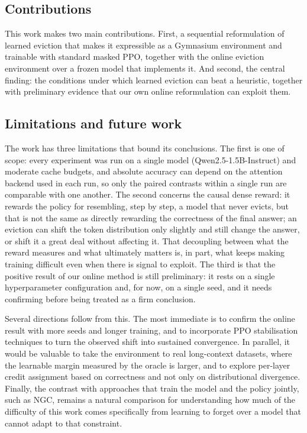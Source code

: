 \subsection{Contributions}

This work makes two main contributions. First, a sequential reformulation of learned eviction that makes it expressible as a Gymnasium environment and trainable with standard masked PPO, together with the online eviction environment over a frozen model that implements it. And second, the central finding: the conditions under which learned eviction can beat a heuristic, together with preliminary evidence that our own online reformulation can exploit them.

\subsection{Limitations and future work}

The work has three limitations that bound its conclusions. The first is one of scope: every experiment was run on a single model (Qwen2.5-1.5B-Instruct) and moderate cache budgets, and absolute accuracy can depend on the attention backend used in each run, so only the paired contrasts within a single run are comparable with one another. The second concerns the causal dense reward: it rewards the policy for resembling, step by step, a model that never evicts, but that is not the same as directly rewarding the correctness of the final answer; an eviction can shift the token distribution only slightly and still change the answer, or shift it a great deal without affecting it. That decoupling between what the reward measures and what ultimately matters is, in part, what keeps making training difficult even when there is signal to exploit. The third is that the positive result of our online method is still preliminary: it rests on a single hyperparameter configuration and, for now, on a single seed, and it needs confirming before being treated as a firm conclusion.

Several directions follow from this. The most immediate is to confirm the online result with more seeds and longer training, and to incorporate PPO stabilisation techniques to turn the observed shift into sustained convergence. In parallel, it would be valuable to take the environment to real long-context datasets, where the learnable margin measured by the oracle is larger, and to explore per-layer credit assignment based on correctness and not only on distributional divergence. Finally, the contrast with approaches that train the model and the policy jointly, such as NGC, remains a natural comparison for understanding how much of the difficulty of this work comes specifically from learning to forget over a model that cannot adapt to that constraint.
